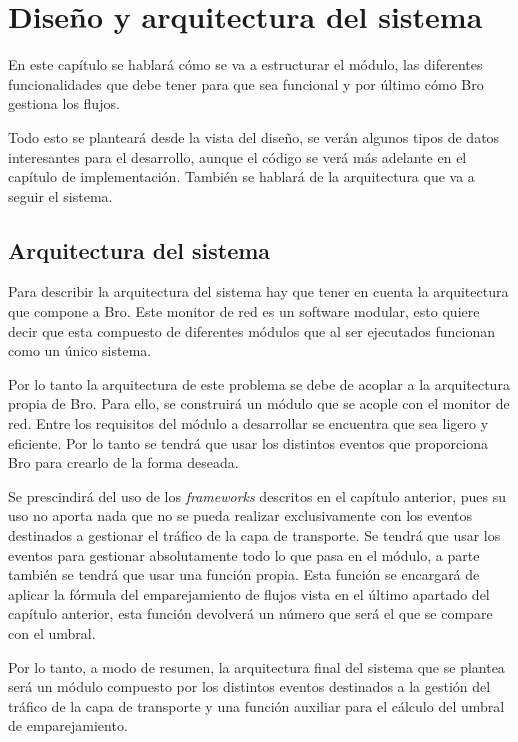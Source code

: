 \chapter{Diseño y arquitectura del sistema}

En este capítulo se hablará cómo se va a estructurar el módulo, las diferentes funcionalidades que debe tener 
para que sea funcional y por último cómo Bro gestiona los flujos.

\intro Todo esto se planteará desde la vista del diseño, se verán algunos tipos de datos interesantes para el 
desarrollo, aunque el código se verá más adelante en el capítulo de implementación. También se hablará de la 
arquitectura que va a seguir el sistema.

\section{Arquitectura del sistema}

Para describir la arquitectura del sistema hay que tener en cuenta la arquitectura que compone a Bro. Este monitor 
de red es un software modular, esto quiere decir que esta compuesto de diferentes módulos que al ser ejecutados 
funcionan como un único sistema.

\intro Por lo tanto la arquitectura de este problema se debe de acoplar a la arquitectura propia de Bro. Para ello, 
se construirá un módulo que se acople con el monitor de red. Entre los requisitos del módulo a desarrollar se 
encuentra que sea ligero y eficiente. Por lo tanto se tendrá que usar los distintos eventos que proporciona Bro 
para crearlo de la forma deseada.

\intro Se prescindirá del uso de los \textit{frameworks} descritos en el capítulo anterior, pues su uso no aporta 
nada que no se pueda realizar exclusivamente con los eventos destinados a gestionar el tráfico de la capa de 
transporte. Se tendrá que usar los eventos para gestionar absolutamente todo lo que pasa en el módulo, a parte 
también se tendrá que usar una función propia. Esta función se encargará de aplicar la fórmula del emparejamiento 
de flujos vista en el último apartado del capítulo anterior, esta función devolverá un número que será el que 
se compare con el umbral.

\intro Por lo tanto, a modo de resumen, la arquitectura final del sistema que se plantea será un módulo 
compuesto por los distintos eventos destinados a la gestión del tráfico de la capa de transporte y una función 
auxiliar para el cálculo del umbral de emparejamiento. 

